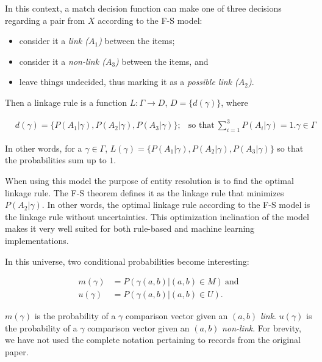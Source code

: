 \documentclass[lettersize,journal]{IEEEtran}
\begin{document}
    In this context, a match decision function can make one of three decisions
    regarding a pair from $X$ according to the F-S model:
    
    \begin{itemize}
        \item consider it a \textit{link ($A_1$)} between the items;
        \item consider it a \textit{non-link ($A_3$)} between the items, and
        \item leave things undecided, thus marking it as a \textit{possible link
              ($A_2$)}.
    \end{itemize}
    
    Then a linkage rule is a function $L:\varGamma \rightarrow D$,
    $D=\{d(\gamma)\}$, where
    
    \begin{align}
        &d(\gamma) = \{P(A_1|\gamma),P(A_2|\gamma),P(A_3|\gamma)\};
        &\textrm{so that}~\sum_{i=1}^{3}P(A_i|\gamma) = 1\nonumber.
        \gamma \in \varGamma\nonumber
    \end{align}

    In other words, for a $\gamma \in \varGamma$, $L(\gamma) = \{P(A_1|\gamma),
    P(A_2|\gamma), P(A_3|\gamma)\}$ so that the probabilities sum up to $1$.

    When using this model the purpose of entity resolution is to find the
    optimal linkage rule.
    The F-S theorem defines it as the linkage rule that minimizes
    $P(A_2|\gamma)$.
    In other words, the optimal linkage rule according to the F-S model is the
    linkage rule without uncertainties.
    This optimization inclination of the model makes it very well suited for
    both rule-based\cite{oyster2012} and machine learning\cite{deepm2020}
    implementations.
    
    In this universe, two conditional probabilities become interesting:

    \begin{align}
        m(\gamma)&=P(\gamma(a, b) | (a, b) \in M)~\textrm{and}\nonumber\\
        u(\gamma)&=P(\gamma(a, b) | (a, b) \in U)\textrm{.}\nonumber
    \end{align}

    \noindent
    $m(\gamma)$ is the probability of a $\gamma$ comparison vector given an
    $(a, b)$ \textit{link}.
    $u(\gamma)$ is the probability of a $\gamma$ comparison vector given an
    $(a, b)$ \textit{non-link}.
    For brevity, we have not used the complete notation pertaining to records
    from the original paper.
\end{document}
